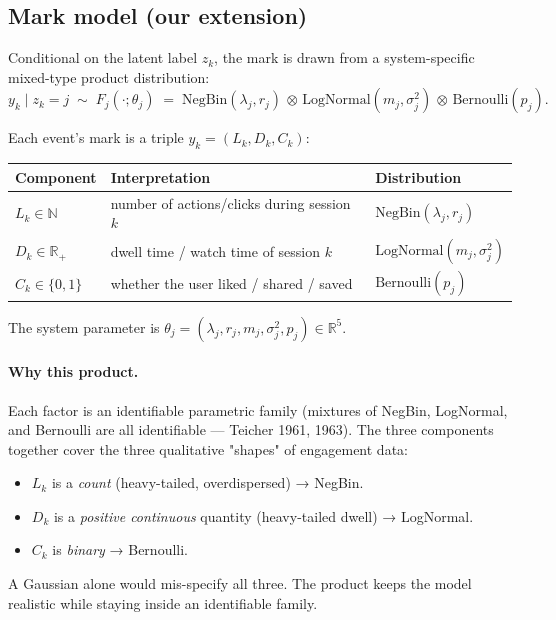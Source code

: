 \documentclass[11pt]{article}
\newcommand{\RR}{\mathbb{R}}
\newcommand{\NegBin}{\mathrm{NegBin}}
\newcommand{\LogNormal}{\mathrm{LogNormal}}
\newcommand{\Bernoulli}{\mathrm{Bernoulli}}
\begin{document}
\subsection{Mark model (our extension)}

Conditional on the latent label $z_k$, the mark is drawn from a system-specific mixed-type product distribution:
\begin{equation}
y_k \mid z_k = j \;\sim\; F_j(\cdot; \theta_j) \;=\; \NegBin(\lambda_j, r_j) \,\otimes\, \LogNormal(m_j, \sigma_j^2) \,\otimes\, \Bernoulli(p_j). \label{eq:marks}
\end{equation}

Each event's mark is a triple $y_k = (L_k, D_k, C_k)$:

\begin{center}
\begin{tabular}{@{}lll@{}}
\toprule
Component & Interpretation & Distribution \\
\midrule
$L_k \in \mathbb{N}$              & number of actions/clicks during session $k$         & $\NegBin(\lambda_j, r_j)$ \\
$D_k \in \RR_+$                   & dwell time / watch time of session $k$                & $\LogNormal(m_j, \sigma_j^2)$ \\
$C_k \in \{0, 1\}$                & whether the user liked / shared / saved               & $\Bernoulli(p_j)$ \\
\bottomrule
\end{tabular}
\end{center}

The system parameter is $\theta_j = (\lambda_j, r_j, m_j, \sigma_j^2, p_j) \in \RR^5$.

\paragraph{Why this product.} Each factor is an identifiable parametric family (mixtures of NegBin, LogNormal, and Bernoulli are all identifiable — Teicher 1961, 1963). The three components together cover the three qualitative "shapes" of engagement data:
\begin{itemize}[leftmargin=*,nosep]
\item $L_k$ is a \emph{count} (heavy-tailed, overdispersed) → NegBin.
\item $D_k$ is a \emph{positive continuous} quantity (heavy-tailed dwell) → LogNormal.
\item $C_k$ is \emph{binary} → Bernoulli.
\end{itemize}
A Gaussian alone would mis-specify all three. The product keeps the model realistic while staying inside an identifiable family.
\end{document}
